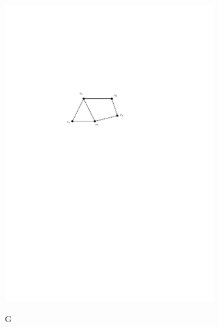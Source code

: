 \begin{figure}[h]
\centering
\begin{subfigure}{0.42\textwidth}
\centering
\includegraphics[width = \textwidth]{../media/iso1.pdf} \\
\caption{G}
\label{fig:iso1}
\end{subfigure}
\hspace{2cm}
\begin{subfigure}{0.30\textwidth}
\centering

\end{subfigure}
\end{figure}
